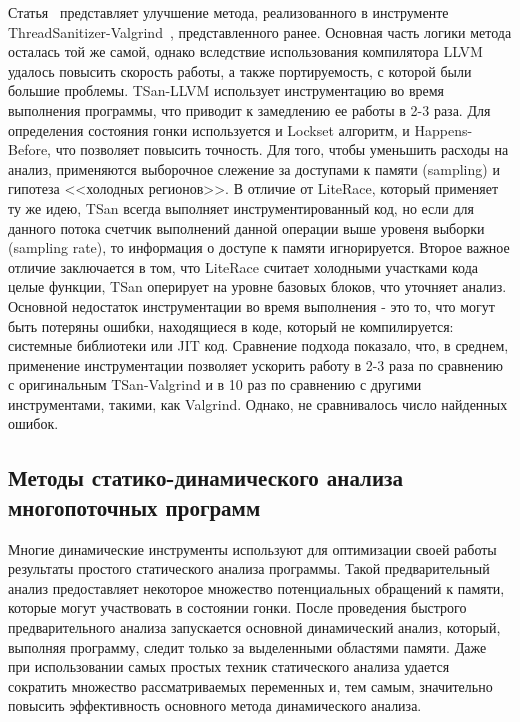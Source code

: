Статья~\cite{Serebryany:2011} представляет улучшение метода, реализованного в инструменте ThreadSanitizer-Valgrind~\cite{TSan}, представленного ранее.
Основная часть логики метода осталась той же самой, однако вследствие использования компилятора LLVM удалось повысить скорость работы, а также портируемость, с которой были большие проблемы. 
TSan-LLVM использует инструментацию во время выполнения программы, что приводит к замедлению ее работы в 2-3 раза.
Для определения состояния гонки используется и Lockset алгоритм, и Happens-Before, что позволяет повысить точность. 
Для того, чтобы уменьшить расходы на анализ, применяются выборочное слежение за доступами к памяти (sampling) и гипотеза <<холодных регионов>>.
В отличие от LiteRace, который применяет ту же идею, TSan всегда выполняет инструментированный код, но если для данного потока счетчик выполнений данной операции выше уровеня выборки (sampling rate), то информация о доступе к памяти игнорируется.
Второе важное отличие заключается в том, что LiteRace считает холодными участками кода целые функции, TSan оперирует на уровне базовых блоков, что уточняет анализ.
Основной недостаток инструментации во время выполнения - это то, что могут быть потеряны ошибки, находящиеся в коде, который не компилируется: системные библиотеки или JIT код. 
Сравнение подхода показало, что, в среднем, применение инструментации позволяет ускорить работу в 2-3 раза по сравнению с оригинальным TSan-Valgrind и в 10 раз по сравнению с другими инструментами, такими, как Valgrind. Однако, не сравнивалось число найденных ошибок. 




\subsection{Методы статико-динамического анализа многопоточных программ}

Многие динамические инструменты используют для оптимизации своей работы результаты простого статического анализа программы.
Такой предварительный анализ предоставляет некоторое множество потенциальных обращений к памяти, которые могут участвовать в состоянии гонки.
После проведения быстрого предварительного анализа запускается основной динамический анализ, который, выполняя программу, следит только за выделенными областями памяти. 
Даже при использовании самых простых техник статического анализа удается сократить множество рассматриваемых переменных и, тем самым, значительно повысить эффективность основного метода динамического анализа.

